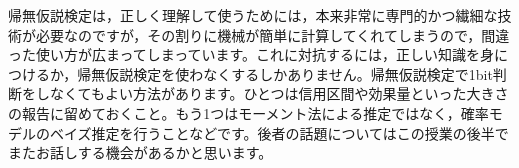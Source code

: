 \documentclass{ltjsarticle}
\begin{document}
帰無仮説検定は，正しく理解して使うためには，本来非常に専門的かつ繊細な技術が必要なのですが，その割りに機械が簡単に計算してくれてしまうので，間違った使い方が広まってしまっています。これに対抗するには，正しい知識を身につけるか，帰無仮説検定を使わなくするしかありません。帰無仮説検定で1bit判断をしなくてもよい方法があります。ひとつは信用区間や効果量といった大きさの報告に留めておくこと。もう1つはモーメント法による推定ではなく，確率モデルのベイズ推定を行うことなどです。後者の話題についてはこの授業の後半でまたお話しする機会があるかと思います。





\end{document}
